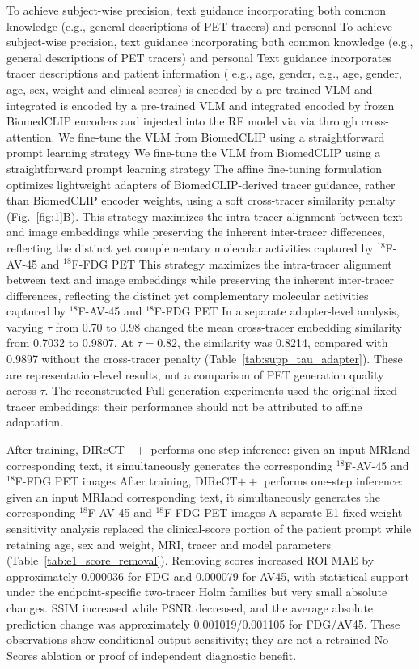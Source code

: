 \documentclass{article}
\providecommand{\DIFaddtex}[1]{{\protect\color{blue} \sf #1}} %
\providecommand{\DIFdeltex}[1]{{\protect\color{red} \ifmmode #1\else\scriptsize #1\fi}} %
\providecommand{\DIFaddbegin}{} %
\providecommand{\DIFaddend}{} %
\providecommand{\DIFdelbegin}{} %
\providecommand{\DIFdelend}{} %
\providecommand{\DIFadd}[1]{\texorpdfstring{\DIFaddtex{#1}}{#1}} %
\providecommand{\DIFdel}[1]{\texorpdfstring{\DIFdeltex{#1}}{}} %
\newcommand{\DIFscaledelfig}{0.5}
\newlength{\DIFdelgraphicswidth} %
\newlength{\DIFdelgraphicsheight} %
\newcommand{\DIFaddincludegraphics}[2][]{{\color{blue}\fbox{\DIFOincludegraphics[#1]{#2}}}} %
\newcommand{\DIFdelincludegraphics}[2][]{%
\sbox{\DIFdelgraphicsbox}{\DIFOincludegraphics[#1]{#2}}%
\settoboxwidth{\DIFdelgraphicswidth}{\DIFdelgraphicsbox} %
\settoboxtotalheight{\DIFdelgraphicsheight}{\DIFdelgraphicsbox} %
\scalebox{\DIFscaledelfig}{%
\parbox[b]{\DIFdelgraphicswidth}{\usebox{\DIFdelgraphicsbox}\\[-\baselineskip] \rule{\DIFdelgraphicswidth}{0em}}\llap{\resizebox{\DIFdelgraphicswidth}{\DIFdelgraphicsheight}{%
\setlength{\unitlength}{\DIFdelgraphicswidth}%
\begin{picture}(1,1)%
\thicklines\linethickness{2pt} %
{\color[rgb]{1,0,0}\put(0,0){\framebox(1,1){}}}%
{\color[rgb]{1,0,0}\put(0,0){\line( 1,1){1}}}%
{\color[rgb]{1,0,0}\put(0,1){\line(1,-1){1}}}%
\end{picture}%
}\hspace*{3pt}}} %
} %
\DeclareRobustCommand{\DIFaddbegin}{\DIFOaddbegin \let\includegraphics\DIFaddincludegraphics} %
\DeclareRobustCommand{\DIFaddend}{\DIFOaddend \let\includegraphics\DIFOincludegraphics} %
\DeclareRobustCommand{\DIFdelbegin}{\DIFOdelbegin \let\includegraphics\DIFdelincludegraphics} %
\DeclareRobustCommand{\DIFdelend}{\DIFOaddend \let\includegraphics\DIFOincludegraphics} %
\begin{document}
\DIFdelbegin \DIFdel{To achieve subject-wise precision, text guidance incorporating both common knowledge (e.g., general descriptions of PET tracers) and personal }\DIFdelend \DIFaddbegin \DIFadd{Text guidance incorporates tracer descriptions and }\DIFaddend patient information (\DIFdelbegin \DIFdel{e.g., age, gender, }\DIFdelend \DIFaddbegin \DIFadd{age, sex, weight and }\DIFaddend clinical scores) \DIFdelbegin \DIFdel{is encoded by a pre-trained VLM and integrated }\DIFdelend \DIFaddbegin \DIFadd{encoded by frozen BiomedCLIP encoders and injected }\DIFaddend into the RF model \DIFdelbegin \DIFdel{via }\DIFdelend \DIFaddbegin \DIFadd{through }\DIFaddend cross-attention. \DIFdelbegin \DIFdel{We fine-tune the VLM from BiomedCLIP using a straightforward prompt learning strategy }\DIFdelend \DIFaddbegin \DIFadd{The affine fine-tuning formulation optimizes lightweight adapters of BiomedCLIP-derived tracer guidance, rather than BiomedCLIP encoder weights, using a soft cross-tracer similarity penalty }\DIFaddend (Fig.~\ref{fig:1}B). \DIFdelbegin \DIFdel{This strategy maximizes the intra-tracer alignment between text and image embeddings while preserving the inherent inter-tracer differences, reflecting the distinct yet complementary molecular activities captured by $^{18}$F-AV-45 and $^{18}$F-FDG PET }\DIFdelend \DIFaddbegin \DIFadd{In a separate adapter-level analysis, varying $\tau$ from 0.70 to 0.98 changed the mean cross-tracer embedding similarity from 0.7032 to 0.9807. At $\tau=0.82$, the similarity was 0.8214, compared with 0.9897 without the cross-tracer penalty (Table~\ref{tab:supp_tau_adapter}). These are representation-level results, not a comparison of PET generation quality across $\tau$. The reconstructed Full generation experiments used the original fixed tracer embeddings; their performance should not be attributed to affine adaptation}\DIFaddend .

\DIFdelbegin \DIFdel{After training, DIReCT$++$ performs one-step inference: given an input MRIand corresponding text, it simultaneously generates the corresponding $^{18}$F-AV-45 and $^{18}$F-FDG PET images }\DIFdelend \DIFaddbegin \DIFadd{A separate E1 fixed-weight sensitivity analysis replaced the clinical-score portion of the patient prompt while retaining age, sex and weight, MRI, tracer and model parameters (Table~\ref{tab:e1_score_removal}). Removing scores increased ROI MAE by approximately 0.000036 for FDG and 0.000079 for AV45, with statistical support under the endpoint-specific two-tracer Holm families but very small absolute changes. SSIM increased while PSNR decreased, and the average absolute prediction change was approximately 0.001019/0.001105 for FDG/AV45. These observations show conditional output sensitivity; they are not a retrained No-Scores ablation or proof of independent diagnostic benefit.
}
\end{document}
